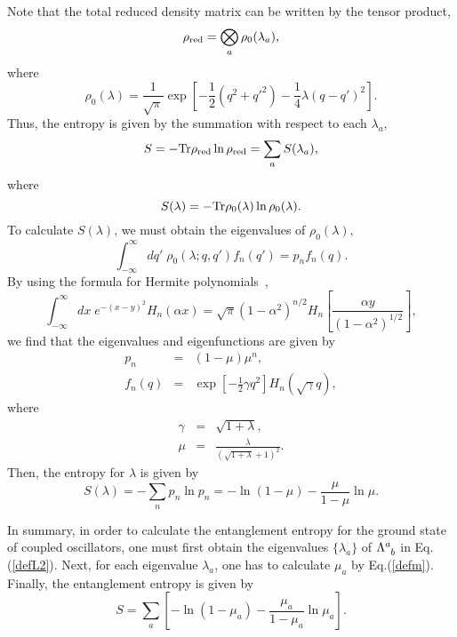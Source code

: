 Note that the total reduced density matrix can be 
written by the tensor product,
\begin{equation}
  \rho_{{\rm red}}=\bigotimes_a \rho_0(\lambda_a),
\end{equation}
where
\begin{equation}
\rho_0(\lambda)=
\frac{1}{\sqrt{\pi}}\exp\left[-\frac{1}{2}
  \left(q^2+q'^2\right)
-\frac{1}{4}\lambda\left(q-q'\right)^2\right].
\end{equation}
Thus, the entropy is given by
the summation with respect to each $\lambda_a$,
\begin{equation}
 S=-{\rm Tr}\rho_{{\rm red}}\ln\rho_{{\rm red}}
  =\sum_a S(\lambda_a),
\end{equation}
where
\begin{equation}
 S(\lambda)=-{\rm Tr}\rho_0(\lambda)\ln\rho_0(\lambda).
\end{equation}
To calculate $S(\lambda)$, we must obtain
the eigenvalues of $\rho_0(\lambda)$,
\begin{equation}
  \int^\infty_{-\infty}dq'\;\rho_0(\lambda;q,q')f_n(q')
   =p_nf_n(q).
\end{equation}
By using the formula for Hermite polynomials~\cite{GraRyz80},
\begin{equation}
\int^\infty_{-\infty}dx\;e^{-(x-y)^2}H_n(\alpha x)
  =\sqrt{\pi}\left(1-\alpha^2\right)^{n/2}H_n
  \left[\frac{\alpha y}{\left(1-\alpha^2\right)^{1/2}}
  \right],
\end{equation}
we find that the eigenvalues and
eigenfunctions are given by~\cite{Sredni93}
\begin{eqnarray}
  p_n    &=& (1-\mu)\mu^n,          \\
  f_n(q) &=&  \exp\left[-\frac{1}{2}\gamma q^2\right]
              H_n(\sqrt{\gamma}q),
\end{eqnarray}
where
\begin{eqnarray}
   \gamma &=& \sqrt{1+\lambda}, \\
   \mu &=& \frac{\lambda}{\left(\sqrt{1+\lambda}+1\right)^2}.
   \label{defm}
\end{eqnarray}
Then, the entropy for $\lambda$ is given by
\begin{equation}
 S(\lambda)=-\sum_np_n\ln p_n=-\ln(1-\mu)-\frac{\mu}{1-\mu}\ln\mu.
\label{defS}
\end{equation}

In summary,
in order to calculate the entanglement entropy
for the ground state of coupled oscillators,
one must first obtain the eigenvalues $\{\lambda_a\}$ of 
$\Lambda^a_{\sp b}$ in Eq.(\ref{defL2}).
Next, for each eigenvalue $\lambda_a$,
one has to calculate $\mu_a$ by Eq.(\ref{defm}).
Finally, the entanglement entropy is given by
\begin{equation}
  S=\sum_a\left[-\ln(1-\mu_a)-\frac{\mu_a}{1-\mu_a}\ln\mu_a\right].
\end{equation}


